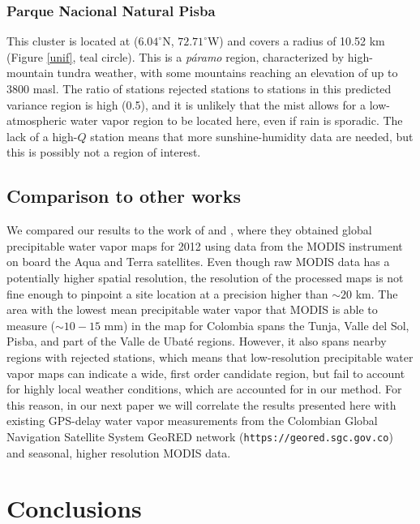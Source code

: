 \documentclass[12pt]{iopart}
\begin{document}
\subsubsection{Parque Nacional Natural Pisba}

This cluster is located at ($6.04^\circ$N, $72.71^\circ$W) and covers a radius of 10.52 km (Figure \ref{unif}, teal circle). This is a \emph{p\'aramo} region, characterized by high-mountain tundra weather, with some mountains reaching an elevation of up to 3800 masl. The ratio of stations rejected stations to stations in this predicted variance region is high (0.5), and it is unlikely that the mist allows for a low-atmospheric water vapor region to be located here, even if rain is sporadic. The lack of a high-$Q$ station means that more sunshine-humidity data are needed, but this is possibly not a region of interest.

\subsection{Comparison to other works}

We compared our results to the work of   and , where they obtained global precipitable water vapor maps for 2012 using data from the MODIS instrument on board the Aqua and Terra satellites. Even though raw MODIS data has a potentially higher spatial resolution, the resolution of the processed maps is not fine enough to pinpoint a site location at a precision higher than $\sim20$ km. The area with the lowest mean precipitable water vapor that MODIS is able to measure ($\sim10-15$ mm) in the  map for Colombia spans the Tunja, Valle del Sol, Pisba, and part of the Valle de Ubat\'e regions. However, it also spans nearby regions with rejected stations, which means that low-resolution precipitable water vapor maps can indicate a wide, first order candidate region, but fail to account for highly local weather conditions, which are accounted for in our method. For this reason, in our next paper we will correlate the results presented here with existing GPS-delay water vapor measurements from the Colombian Global Navigation Satellite System GeoRED network (\texttt{https://geored.sgc.gov.co}) and seasonal, higher resolution MODIS data.

\section{Conclusions}
\end{document}
